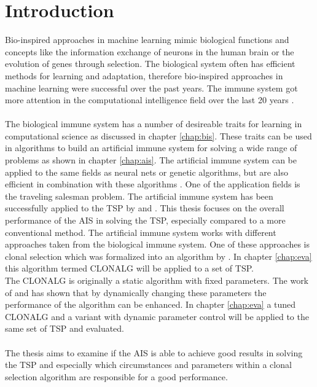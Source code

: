 %
%
% 
% 
% 


\chapter{Introduction}
\label{chap:intro}

Bio-inspired approaches in machine learning mimic biological functions and concepts like the information exchange of neurons in the human brain or the evolution of genes through selection. The biological system often has efficient methods for learning and adaptation, therefore bio-inspired approaches in machine learning were successful over the past years. The immune system got more attention in the computational intelligence field over the last 20 years \cite{tan2016artificial}.\\\\
The biological immune system has a number of desireable traits for learning in computational science as discussed in chapter \ref{chap:bis}. These traits can be used in algorithms to build an artificial immune system for solving a wide range of problems as shown in chapter \ref{chap:ais}. The artificial immune system can be applied to the same fields as neural nets or genetic algorithms, but are also efficient in combination with these algorithms \cite{Pasti06}. One of the  application fields is the traveling salesman problem. The artificial immune system has been successfully applied to the TSP by \cite{DEC02} and \cite{sun}. This thesis focuses on the overall performance of the AIS in solving the TSP, especially compared to a more conventional method. The artificial immune system works with different approaches taken from the biological immune system. One of these approaches is clonal selection which was formalized into an algorithm by \cite{DEC02}. In chapter \ref{chap:eva} this algorithm termed CLONALG will be applied to a set of TSP.\\
The CLONALG is originally a static algorithm with fixed parameters. The work of \cite{RIFF09} and \cite{Garret04} has shown that by dynamically changing these parameters the performance of the algorithm can be enhanced. In chapter \ref{chap:eva} a tuned CLONALG and a variant with dynamic parameter control will be applied to the same set of TSP and evaluated.\\\\
The thesis aims to examine if the AIS is able to achieve good results in solving the TSP and especially which circumstances and parameters within a clonal selection algorithm are responsible for a good performance.




